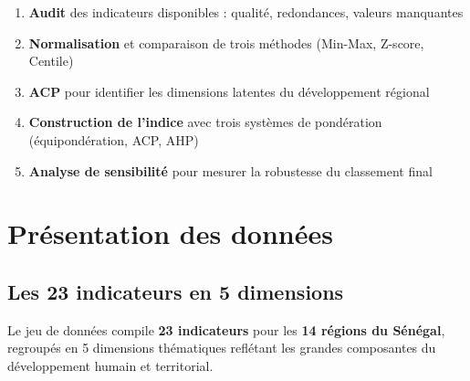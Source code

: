 \documentclass[
]{article}
\providecommand{\tightlist}{%
  \setlength{\itemsep}{0pt}\setlength{\parskip}{0pt}}
\begin{document}
\begin{enumerate}
\def\labelenumi{\arabic{enumi}.}
\tightlist
\item
  \textbf{Audit} des indicateurs disponibles : qualité, redondances,
  valeurs manquantes
\item
  \textbf{Normalisation} et comparaison de trois méthodes (Min-Max,
  Z-score, Centile)
\item
  \textbf{ACP} pour identifier les dimensions latentes du développement
  régional
\item
  \textbf{Construction de l'indice} avec trois systèmes de pondération
  (équipondération, ACP, AHP)
\item
  \textbf{Analyse de sensibilité} pour mesurer la robustesse du
  classement final
\end{enumerate}

\newpage

\section{Présentation des données}\label{pruxe9sentation-des-donnuxe9es}

\subsection{Les 23 indicateurs en 5
dimensions}\label{les-23-indicateurs-en-5-dimensions}

Le jeu de données compile \textbf{23 indicateurs} pour les \textbf{14
régions du Sénégal}, regroupés en 5 dimensions thématiques reflétant les
grandes composantes du développement humain et territorial.

\begingroup\fontsize{8.5}{10.5}\selectfont
\end{document}
